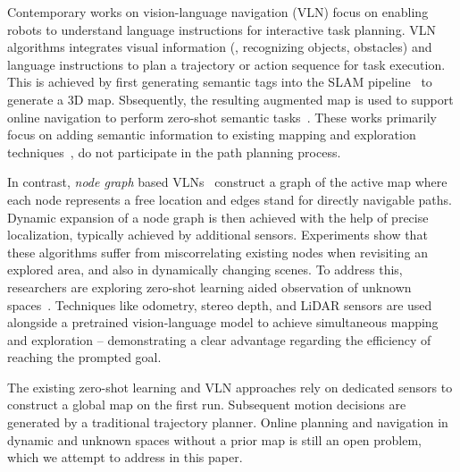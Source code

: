 Contemporary works on vision-language navigation (VLN) focus on enabling robots to understand language instructions for interactive task planning. VLN algorithms integrates visual information (\eg, recognizing objects, obstacles) and language instructions to plan a trajectory or action sequence for task execution. This is achieved by first generating semantic tags into the SLAM pipeline~\cite{huang2023visual,Gadre2022CoWsOP, Guan2024LOCZSONLO} to generate a 3D map. Sbsequently, the resulting augmented map is used to support online navigation to perform zero-shot semantic tasks~\cite{yokoyama2023vlfmvisionlanguagefrontiermaps}. These works primarily focus on adding semantic information to existing mapping and exploration techniques~\cite{huang2023visual,krantz2020navgraph}, do not participate in the path planning process.

In contrast, \textit{node graph} based VLNs~\cite{anderson2018visionandlanguagenavigationinterpretingvisuallygrounded, kiran2022spatialrelationgraphgraph,Savarese-RSS-19} construct a graph of the active map where each node represents a free location and edges stand for directly navigable paths. Dynamic expansion of a node graph is then achieved with the help of precise localization, typically achieved by additional sensors. Experiments show that these algorithms suffer from miscorrelating existing nodes when revisiting an explored area, and also in dynamically changing scenes. To address this, researchers are exploring zero-shot learning aided observation of unknown spaces~\cite{yokoyama2023vlfmvisionlanguagefrontiermaps}. Techniques like odometry, stereo depth, and LiDAR sensors are used alongside a pretrained vision-language model to achieve simultaneous mapping and exploration -- demonstrating a clear advantage regarding the efficiency of reaching the prompted goal.

The existing zero-shot learning and VLN approaches rely on dedicated sensors to construct a global map on the first run. Subsequent motion decisions are generated by a traditional trajectory planner. Online planning and navigation in dynamic and unknown spaces without a prior map is still an open problem, which we attempt to address in this paper.



